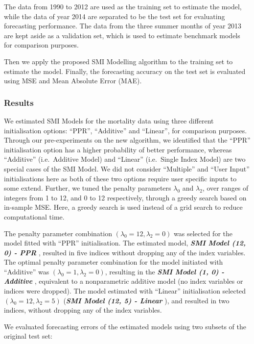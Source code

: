 \documentclass[
  11pt,
  a4paper,
]{article}
\begin{document}
The data from 1990 to 2012 are used as the training set to estimate the
model, while the data of year 2014 are separated to be the test set for
evaluating forecasting performance. The data from the three summer
months of year 2013 are kept aside as a validation set, which is used to
estimate benchmark models for comparison purposes.

Then we apply the proposed SMI Modelling algorithm to the training set
to estimate the model. Finally, the forecasting accuracy on the test set
is evaluated using MSE and Mean Absolute Error (MAE).

\subsubsection{Results}\label{results}

We estimated SMI Models for the mortality data using three different
initialisation options: ``PPR'', ``Additive'' and ``Linear'', for
comparison purposes. Through our pre-experiments on the new algorithm,
we identified that the ``PPR'' initialisation option has a higher
probability of better performance, whereas ``Additive'' (i.e.~Additive
Model) and ``Linear'' (i.e.~Single Index Model) are two special cases of
the SMI Model. We did not consider ``Multiple'' and ``User Input''
initialisations here as both of these two options require user specific
inputs to some extend. Further, we tuned the penalty parameters
\(\lambda_{0}\) and \(\lambda_{2}\), over ranges of integers from 1 to
12, and 0 to 12 respectively, through a greedy search based on in-sample
MSE. Here, a greedy search is used instead of a grid search to reduce
computational time.

The penalty parameter combination
\((\lambda_{0} = 12, \lambda_{2} = 0)\) was selected for the model
fitted with ``PPR'' initialisation. The estimated model,
\textbf{\emph{SMI Model (12, 0) - PPR }}, resulted in five indices
without dropping any of the index variables. The optimal penalty
parameter combination for the model initiated with ``Additive'' was
\((\lambda_{0} = 1, \lambda_{2} = 0)\), resulting in the
\textbf{\emph{SMI Model (1, 0) - Additive }}, equivalent to a
nonparametric additive model (no index variables or indices were
dropped). The model estimated with ``Linear'' initialisation selected
\((\lambda_{0} = 12, \lambda_{2} = 5)\) (\textbf{\emph{SMI Model (12, 5)
- Linear }}), and resulted in two indices, without dropping any of the
index variables.

We evaluated forecasting errors of the estimated models using two
subsets of the original test set:
\end{document}
